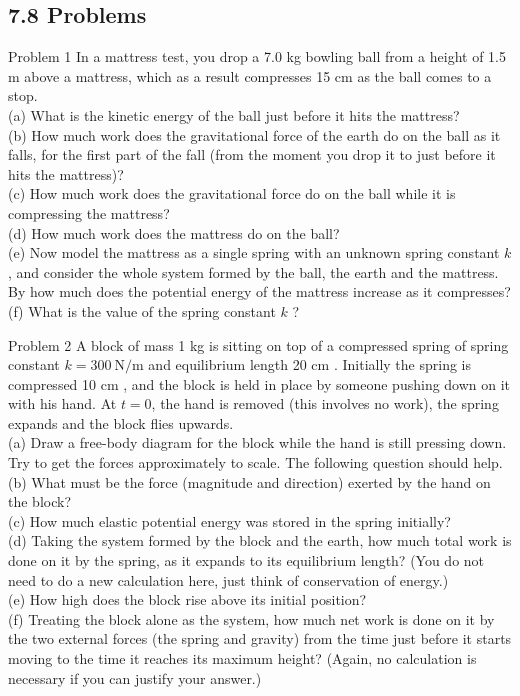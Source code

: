 \documentclass[10pt]{article}
\begin{document}
\subsection*{7.8 Problems}
Problem 1 In a mattress test, you drop a 7.0 kg bowling ball from a height of 1.5 m above a mattress, which as a result compresses 15 cm as the ball comes to a stop.\\
(a) What is the kinetic energy of the ball just before it hits the mattress?\\
(b) How much work does the gravitational force of the earth do on the ball as it falls, for the first part of the fall (from the moment you drop it to just before it hits the mattress)?\\
(c) How much work does the gravitational force do on the ball while it is compressing the mattress?\\
(d) How much work does the mattress do on the ball?\\
(e) Now model the mattress as a single spring with an unknown spring constant $k$, and consider the whole system formed by the ball, the earth and the mattress. By how much does the potential energy of the mattress increase as it compresses?\\
(f) What is the value of the spring constant $k$ ?

Problem 2 A block of mass 1 kg is sitting on top of a compressed spring of spring constant $k=300 \mathrm{~N} / \mathrm{m}$ and equilibrium length 20 cm . Initially the spring is compressed 10 cm , and the block is held in place by someone pushing down on it with his hand. At $t=0$, the hand is removed (this involves no work), the spring expands and the block flies upwards.\\
(a) Draw a free-body diagram for the block while the hand is still pressing down. Try to get the forces approximately to scale. The following question should help.\\
(b) What must be the force (magnitude and direction) exerted by the hand on the block?\\
(c) How much elastic potential energy was stored in the spring initially?\\
(d) Taking the system formed by the block and the earth, how much total work is done on it by the spring, as it expands to its equilibrium length? (You do not need to do a new calculation here, just think of conservation of energy.)\\
(e) How high does the block rise above its initial position?\\
(f) Treating the block alone as the system, how much net work is done on it by the two external forces (the spring and gravity) from the time just before it starts moving to the time it reaches its maximum height? (Again, no calculation is necessary if you can justify your answer.)
\end{document}
